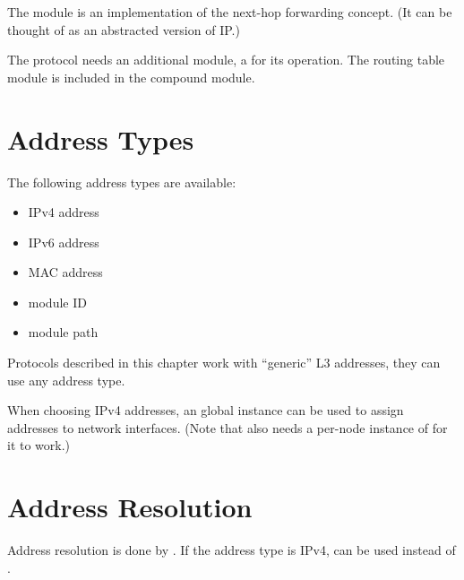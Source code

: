 The  module is an implementation of the next-hop
forwarding concept. (It can be thought of as an abstracted version of IP.) 

The protocol needs an additional module, a  for its
operation. The routing table module is included in the
 compound module.


\section{Address Types}

The following address types are available:

\begin{itemize}
  \item IPv4 address
  \item IPv6 address
  \item MAC address
  \item module ID
  \item module path
\end{itemize}

Protocols described in this chapter work with ``generic'' L3 addresses,
they can use any address type.

When choosing IPv4 addresses, an  global
instance can be used to assign addresses to network interfaces. (Note that 
 also needs a per-node instance
of  for it to work.)

\section{Address Resolution}

Address resolution is done by .
If the address type is IPv4,  can be used instead of
.




\fi


